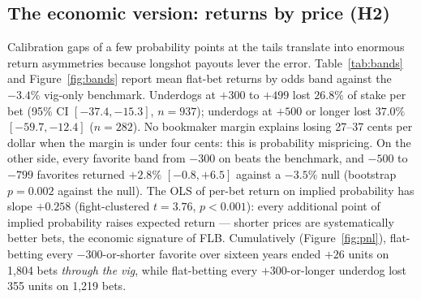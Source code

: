 \documentclass[11pt]{article}
\begin{document}
\subsection{The economic version: returns by price (H2)}

Calibration gaps of a few probability points at the tails translate into enormous return
asymmetries because longshot payouts lever the error. Table~\ref{tab:bands} and
Figure~\ref{fig:bands} report mean flat-bet returns by odds band against the $-3.4\%$ vig-only
benchmark. Underdogs at $+300$ to $+499$ lost $26.8\%$ of stake per bet (95\% CI $[-37.4, -15.3]$,
$n=937$); underdogs at $+500$ or longer lost $37.0\%$ $[-59.7, -12.4]$ ($n=282$). No bookmaker
margin explains losing 27--37 cents per dollar when the margin is under four cents: this is
probability mispricing. On the other side, every favorite band from $-300$ on beats the
benchmark, and $-500$ to $-799$ favorites returned $+2.8\%$ $[-0.8, +6.5]$ against a $-3.5\%$
null (bootstrap $p = 0.002$ against the null). The OLS of per-bet return on implied probability
has slope $+0.258$ (fight-clustered $t = 3.76$, $p < 0.001$): every additional point of implied
probability raises expected return --- shorter prices are systematically better bets, the economic
signature of FLB. Cumulatively (Figure~\ref{fig:pnl}), flat-betting every $-300$-or-shorter
favorite over sixteen years ended $+26$ units on 1{,}804 bets \emph{through the vig}, while
flat-betting every $+300$-or-longer underdog lost 355 units on 1{,}219 bets.
\end{document}
